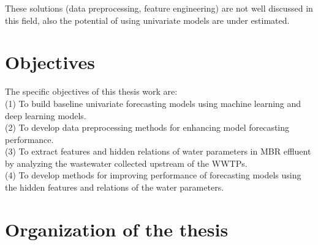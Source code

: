 These solutions (data preprocessing, feature engineering) are not well discussed in this field, also the 
potential of using univariate models are under estimated.

\section{Objectives}
\noindent
The specific objectives of this thesis work are:\\
(1) To build baseline univariate forecasting models using machine learning and deep learning models.\\
(2) To develop data preprocessing methods for enhancing model forecasting performance.\\
(3) To extract features and hidden relations of water parameters in MBR effluent by analyzing the wastewater collected upstream of the WWTPs.\\
(4) To develop methods for improving performance of forecasting models using the hidden features and relations of the water parameters.

\section{Organization of the thesis}